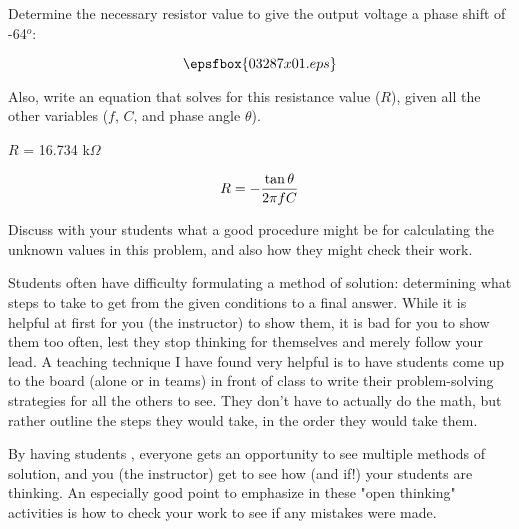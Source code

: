 

Determine the necessary resistor value to give the output voltage a phase shift of -64$^{o}$:

$$\epsfbox{03287x01.eps}$$

Also, write an equation that solves for this resistance value ($R$), given all the other variables ($f$, $C$, and phase angle $\theta$).







$R$ = 16.734 k$\Omega$

$$R = -{{\tan \theta} \over {2 \pi f C}}$$







Discuss with your students what a good procedure might be for calculating the unknown values in this problem, and also how they might check their work.

\vskip 10pt

Students often have difficulty formulating a method of solution: determining what steps to take to get from the given conditions to a final answer.  While it is helpful at first for you (the instructor) to show them, it is bad for you to show them too often, lest they stop thinking for themselves and merely follow your lead.  A teaching technique I have found very helpful is to have students come up to the board (alone or in teams) in front of class to write their problem-solving strategies for all the others to see.  They don't have to actually do the math, but rather outline the steps they would take, in the order they would take them.

By having students , everyone gets an opportunity to see multiple methods of solution, and you (the instructor) get to see how (and if!) your students are thinking.  An especially good point to emphasize in these "open thinking" activities is how to check your work to see if any mistakes were made.




